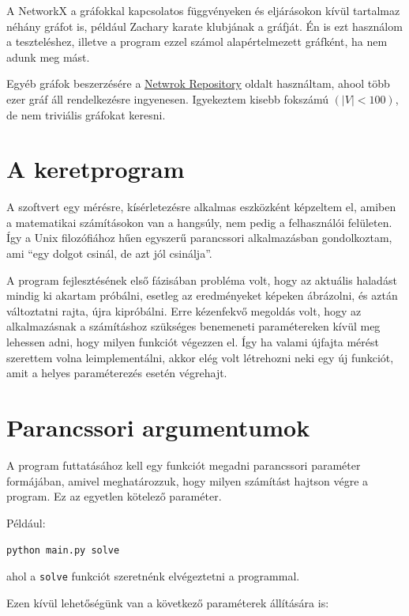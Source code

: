 \documentclass[12pt,numbers=noenddot]{report}
\begin{document}
A NetworkX a gráfokkal kapcsolatos függvényeken és eljárásokon kívül 
tartalmaz néhány gráfot is, például Zachary karate klubjának a gráfját.
Én is ezt használom a teszteléshez, illetve a program ezzel számol 
alapértelmezett gráfként, ha nem adunk meg mást.

Egyéb gráfok beszerzésére a \href{https://networkrepository.com/index.php}{Netwrok Repository}
oldalt használtam, ahool több ezer gráf áll rendelkezésre ingyenesen. 
Igyekeztem kisebb fokszámú $(|V|<100)$, de nem triviális gráfokat keresni.


\section{A keretprogram}
A szoftvert egy mérésre, kísérletezésre alkalmas eszközként képzeltem el,
amiben a matematikai számításokon van a hangsúly, nem pedig a felhasználói felületen.
Így a Unix filozófiához hűen egyszerű parancssori alkalmazásban gondolkoztam,
ami ``egy dolgot csinál, de azt jól csinálja''.

A program fejlesztésének első fázisában probléma volt, hogy az aktuális haladást
mindig ki akartam próbálni, esetleg az eredményeket képeken ábrázolni, és aztán
változtatni rajta, újra kipróbálni. Erre kézenfekvő megoldás volt, hogy 
az alkalmazásnak a számításhoz szükséges benemeneti paramétereken kívül 
meg lehessen adni, hogy milyen funkciót végezzen el.
Így ha valami újfajta mérést szerettem volna leimplementálni, akkor elég volt
létrehozni neki egy új funkciót, amit a helyes paraméterezés esetén végrehajt.

\section{Parancssori argumentumok}

A program futtatásához kell egy funkciót megadni parancssori paraméter formájában, 
amivel meghatározzuk, hogy milyen számítást hajtson végre a program. 
Ez az egyetlen kötelező paraméter.

\noindent
Például:

\texttt{python main.py solve}

\noindent
ahol a \texttt{solve} funkciót szeretnénk elvégeztetni a programmal.

Ezen kívül lehetőségünk van a következő paraméterek állítására is:
\end{document}
